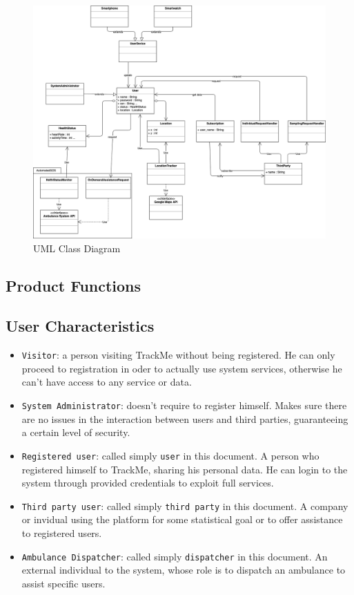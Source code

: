 \documentclass[12pt,a4paper]{article}
\begin{document}
	\begin{figure}[h]
		\includegraphics[width=1.25\linewidth]{Images/uml}
		\caption{UML Class Diagram}
		\label{fig:uml}
	\end{figure}
	
	
	\subsection{Product Functions}
	
	\subsection{User Characteristics}
	\begin{itemize}
		\item \texttt{Visitor}: a person visiting TrackMe without being registered. He can only proceed to registration in oder to actually use system services, otherwise he can't have access to any service or data.
		\item \texttt{System Administrator}: doesn't require to register himself. Makes sure there are no issues in the interaction between users and third parties, guaranteeing a certain level of security.
		\item \texttt{Registered user}: called simply \texttt{user} in this document. A person who registered himself to TrackMe, sharing his personal data. He can login to the system through provided credentials to exploit full services.
		\item \texttt{Third party user}: called simply \texttt{third party} in this document. A company or invidual using the platform for some statistical goal or to offer assistance to registered users.
		\item \texttt{Ambulance Dispatcher}: called simply \texttt{dispatcher} in this document. An external individual to the system, whose role is to dispatch an ambulance to assist specific users.
	\end{itemize}
	
\end{document}
